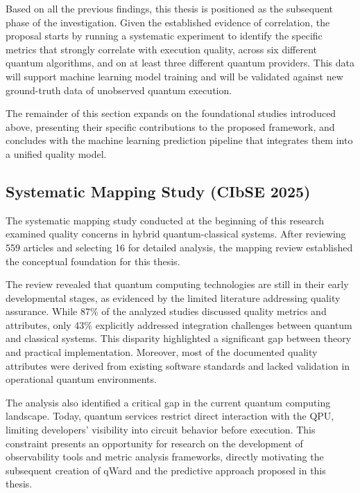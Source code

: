 \documentclass{article}
\begin{document}
Based on all the previous findings, this thesis is positioned as the subsequent phase of the investigation. Given the established evidence of correlation, the proposal starts by running a systematic experiment to identify the specific metrics that strongly correlate with execution quality, across six different quantum algorithms, and on at least three different quantum providers. This data will support machine learning model training and will be validated against new ground-truth data of unobserved quantum execution.

The remainder of this section expands on the foundational studies introduced above, presenting their specific contributions to the proposed framework, and concludes with the machine learning prediction pipeline that integrates them into a unified quality model.

\subsection{Systematic Mapping Study (CIbSE 2025)}
\label{subsection:sms}

The systematic mapping study conducted at the beginning of this research \cite{marquezQualityConcernsWhena_2025} examined quality concerns in hybrid quantum-classical systems. After reviewing 559 articles and selecting 16 for detailed analysis, the mapping review established the conceptual foundation for this thesis.

The review revealed that quantum computing technologies are still in their early developmental stages, as evidenced by the limited literature addressing quality assurance. While 87\% of the analyzed studies discussed quality metrics and attributes, only 43\% explicitly addressed integration challenges between quantum and classical systems. This disparity highlighted a significant gap between theory and practical implementation. Moreover, most of the documented quality attributes were derived from existing software standards and lacked validation in operational quantum environments.

The analysis also identified a critical gap in the current quantum computing landscape. Today, quantum services restrict direct interaction with the QPU, limiting developers' visibility into circuit behavior before execution. This constraint presents an opportunity for research on the development of observability tools and metric analysis frameworks, directly motivating the subsequent creation of qWard and the predictive approach proposed in this thesis.
\end{document}
